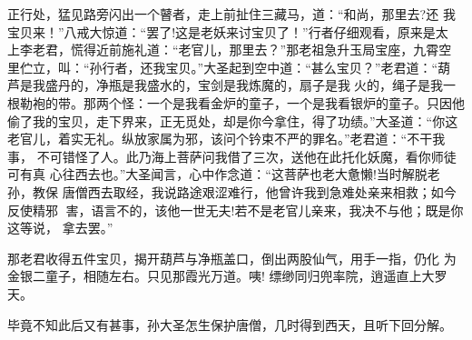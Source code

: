正行处，猛见路旁闪出一个瞽者，走上前扯住三藏马，道：“和尚，那里去?还
我宝贝来！”八戒大惊道：“罢了!这是老妖来讨宝贝了！”行者仔细观看，原来是太
上李老君，慌得近前施礼道：“老官儿，那里去？”那老祖急升玉局宝座，九霄空
里伫立，叫：“孙行者，还我宝贝。”大圣起到空中道：“甚么宝贝？”老君道：“葫
芦是我盛丹的，净瓶是我盛水的，宝剑是我炼魔的，扇子是我火的，绳子是我一
根勒袍的带。那两个怪：一个是我看金炉的童子，一个是我看银炉的童子。只因他
偷了我的宝贝，走下界来，正无觅处，却是你今拿住，得了功绩。”大圣道：“你这
老官儿，着实无礼。纵放家属为邪，该问个钤束不严的罪名。”老君道：“不干我事，
不可错怪了人。此乃海上菩萨问我借了三次，送他在此托化妖魔，看你师徒可有真
心往西去也。”大圣闻言，心中作念道：“这菩萨也老大惫懒!当时解脱老孙，教保
唐僧西去取经，我说路途艰涩难行，他曾许我到急难处亲来相救；如今反使精邪
害，语言不的，该他一世无夫!若不是老官儿亲来，我决不与他；既是你这等说，
拿去罢。”

那老君收得五件宝贝，揭开葫芦与净瓶盖口，倒出两股仙气，用手一指，仍化
为金银二童子，相随左右。只见那霞光万道。咦!
缥缈同归兜率院，逍遥直上大罗天。

毕竟不知此后又有甚事，孙大圣怎生保护唐僧，几时得到西天，且听下回分解。